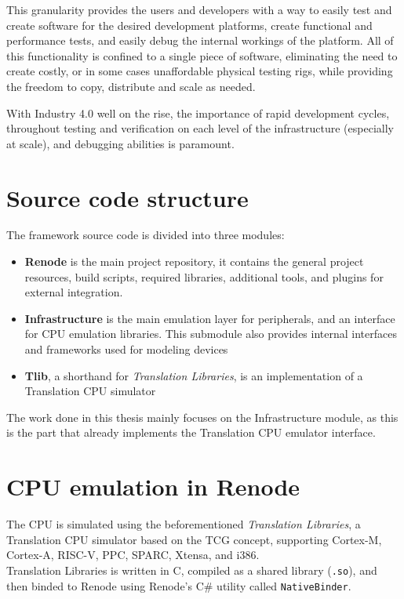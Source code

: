 \noindent
This granularity provides the users and developers with a way to easily test and create software for the desired
development platforms, create functional and performance tests, and easily debug the internal workings of the platform.
All of this functionality is confined to a single piece of software, eliminating the need to create costly, or in some
cases unaffordable physical testing rigs, while providing the freedom to copy, distribute and scale as needed.

With Industry 4.0 well on the rise, the importance of rapid development cycles, throughout testing and verification
on each level of the infrastructure (especially at scale), and debugging abilities is paramount.

\section*{Source code structure}
The framework source code \cite{Renode} is divided into three modules:

\begin{itemize}
    \item{\textbf{Renode} is the main project repository, it contains the general project resources, build
    scripts, required libraries, additional tools, and plugins for external integration.}
    \item{\textbf{Infrastructure} is the main emulation layer for peripherals, and an interface for CPU emulation
    libraries. This submodule also provides internal interfaces and frameworks used for modeling devices}
    \item{\textbf{Tlib}, a shorthand for \textit{Translation Libraries}, is an implementation of a Translation CPU
    simulator}
\end{itemize}

\noindent
The work done in this thesis mainly focuses on the Infrastructure module, as this is the part that already implements
the Translation CPU emulator interface.

\section*{CPU emulation in Renode}

The CPU is simulated using the beforementioned \textit{Translation Libraries}, a Translation CPU simulator
based on the TCG concept, supporting Cortex-M, Cortex-A, RISC-V, PPC, SPARC, Xtensa, and i386.\\
Translation Libraries is written in C, compiled as a shared library (\texttt{.so}), and then binded to Renode using
Renode's C\# utility called \texttt{NativeBinder}.

